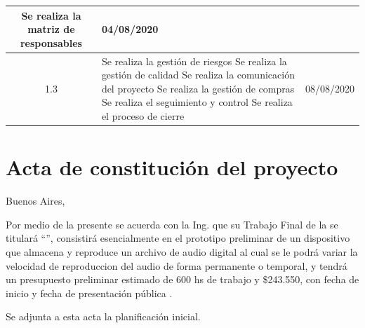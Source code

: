 \documentclass[11pt]{charter}
\begin{document}
\begin{table}[ht]
\begin{tabularx}{\linewidth}{@{}|c|X|c|@{}}
Se realiza la matriz de responsables & 04/08/2020\\ \hline
1.3      & Se realiza la gestión de riesgos \newline                                                                              
Se realiza la gestión de calidad\newline                                                                              
Se realiza la comunicación del proyecto \newline                                                                              
Se realiza la gestión de compras \newline                                                                              
Se realiza el seguimiento y control \newline                                                                              
Se realiza el proceso de cierre & 08/08/2020\\ \hline

\end{tabularx}
\end{table}

\pagebreak



\section{Acta de constitución del proyecto}
\label{sec:acta}

\begin{flushright}
Buenos Aires, \fechaInicioName
\end{flushright}

\vspace{2cm}

Por medio de la presente se acuerda con la Ing. \authorname\hspace{1px} que su Trabajo Final de la \degreename\hspace{1px} se titulará ``\ttitle'', consistirá esencialmente en el prototipo preliminar de un dispositivo que almacena y reproduce un archivo de audio digital al cual se le podrá variar la velocidad de reproduccion del audio de forma permanente o temporal, y tendrá un presupuesto preliminar estimado de 600 hs de trabajo y \$243.550, con fecha de inicio \fechaInicioName\hspace{1px} y fecha de presentación pública \fechaFinalName.

Se adjunta a esta acta la planificación inicial.
\end{document}
